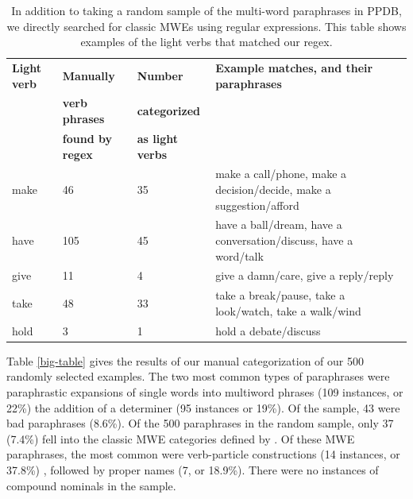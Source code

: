 \documentclass[11pt]{article}
\begin{document}
\begin{center}
\begin{table}
\hfill{}
\begin{tabular}{|l|l|l|p{.5\linewidth}|}
\hline \bf Light verb & \bf Manually  & \bf Number  & \bf Example matches, and their paraphrases\\ 
 & \bf verb phrases & \bf  categorized & \\ 
 & \bf  found by regex & \bf as light verbs & \\ \hline
make & 46 & 35 & make a call/phone, make a decision/decide, make a suggestion/afford\\
have & 105 & 45 & have a ball/dream, have a conversation/discuss, have a word/talk\\
give & 11 & 4 & give a damn/care, give a reply/reply\\
take & 48 & 33 & take a break/pause, take a look/watch, take a walk/wind\\
hold & 3 & 1 & hold a debate/discuss\\
\hline
\end{tabular}
\hfill{}
\caption{In addition to taking a random sample of the multi-word paraphrases in PPDB, we directly searched for classic MWEs using regular expressions. This table shows examples of the light verbs that matched our regex. }
\label{light-verbs}
\end{table}
\end{center}

Table \ref{big-table} gives the results of our manual categorization of our 500 randomly selected examples.  
The two most common types of paraphrases were paraphrastic expansions of single words into multiword phrases (109 instances, or 22\%) 
 the addition of a determiner (95 instances or 19\%). Of the sample, 43 were bad paraphrases (8.6\%).  Of the 500 paraphrases in the random sample, only 37 (7.4\%) fell into the classic MWE categories defined by . Of these MWE paraphrases, the most common were verb-particle constructions (14 instances, or 37.8\%) , followed by proper names (7, or 18.9\%). There were no instances of compound nominals in the sample.
\end{document}
